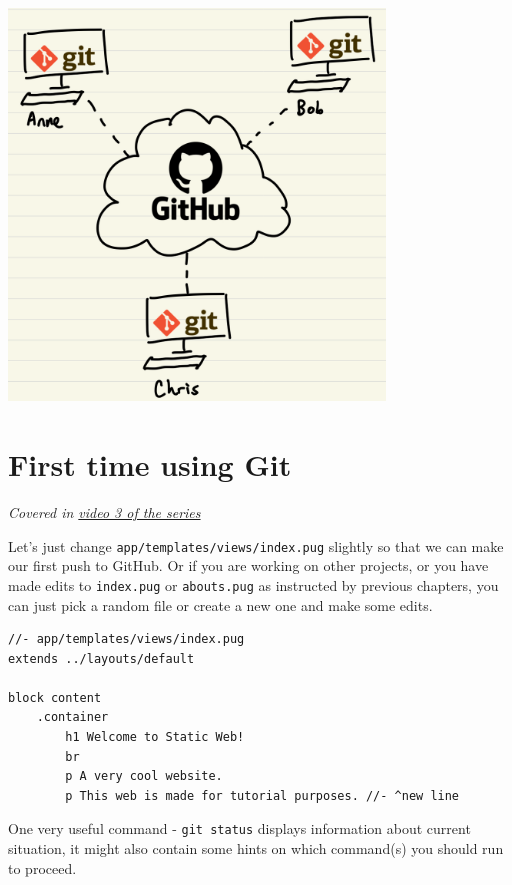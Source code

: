 \begin{center}
\includegraphics[width=10cm]{images/ch3-gitgithub.png}
\end{center}

\section{First time using Git}
\label{sec:gitfirst}

\textit{Covered in \href{https://www.youtube.com/watch?v=wQmFz-Ggxuo&list=PLjGmdnqrOKuYXiu7lgG5HW71jPEUd1XCm&index=4}{video 3 of the series}}
\vspace{6mm}

Let's just change \texttt{app/templates/views/index.pug} slightly so that we can make our first push to GitHub. Or if you are working on other projects, or you have made edits to \texttt{index.pug} or \texttt{abouts.pug} as instructed by previous chapters, you can just pick a random file or create a new one and make some edits.

\begin{lstlisting}[language=pug]
//- app/templates/views/index.pug
extends ../layouts/default

block content
	.container
		h1 Welcome to Static Web!
		br
		p A very cool website.
		p This web is made for tutorial purposes. //- ^new line
\end{lstlisting}

One very useful command - \texttt{git status} displays information about current situation, it might also contain some hints on which command(s) you should run to proceed.

